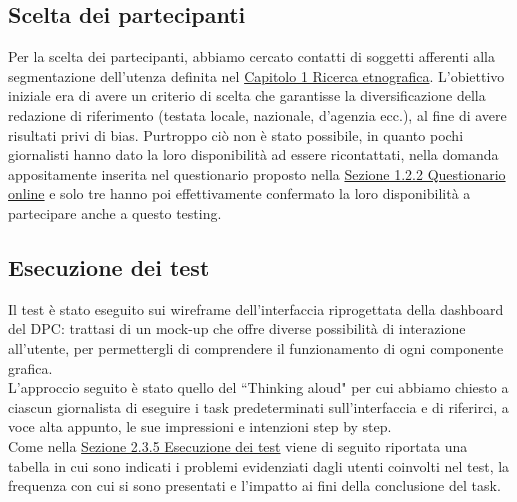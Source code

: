 \subsection{Scelta dei partecipanti}
\label{ss:scelta-partecipanti}
Per la scelta dei partecipanti, abbiamo cercato contatti di soggetti afferenti alla segmentazione dell'utenza definita nel \hyperref[c:ricerca-etnografica]{Capitolo 1 Ricerca etnografica}. L'obiettivo iniziale era di avere un criterio di scelta che garantisse la diversificazione della redazione di riferimento (testata locale, nazionale, d'agenzia ecc.), al fine di avere risultati privi di bias.
Purtroppo ciò non è stato possibile, in quanto pochi giornalisti hanno dato la loro disponibilità ad essere ricontattati, nella domanda appositamente inserita nel questionario proposto nella \hyperref[ss:questionario-online]{Sezione 1.2.2 Questionario online} e solo tre hanno poi effettivamente confermato la loro disponibilità a partecipare anche a questo testing.

\subsection{Esecuzione dei test}
\label{ss:esecuzione-test}
Il test è stato eseguito sui wireframe dell'interfaccia riprogettata della dashboard del DPC: trattasi di un mock-up che offre diverse possibilità di interazione all'utente, per permettergli di comprendere il funzionamento di ogni componente grafica.\\
L'approccio seguito è stato quello del ``Thinking aloud" per cui abbiamo chiesto a ciascun giornalista di eseguire i task predeterminati sull'interfaccia e di riferirci, a voce alta appunto, le sue impressioni e intenzioni step by step.\\
Come nella \hyperref[sss:approccio-adottato]{Sezione 2.3.5 Esecuzione dei test} viene di seguito riportata una tabella in cui sono indicati i problemi evidenziati dagli utenti coinvolti nel test, la frequenza con cui si sono presentati e l'impatto ai fini della conclusione del task.

